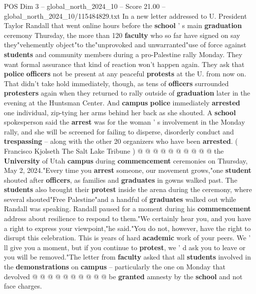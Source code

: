 \begin{textsample}{POS Dim 3 – global\_north\_2024\_10 – Score 21.00 – global\_north\_2024\_10/115484829.txt}  \label{ex:f3_pos_150}
In a new letter addressed to U.
President Taylor Randall that went online hours before the \textbf{school} ' s main \textbf{graduation} ceremony Thursday, the more than 120 \textbf{faculty} who so far have signed on say they"vehemently object"to the"unprovoked and unwarranted"use of force against \textbf{students} and community members during a pro-Palestine rally Monday.
They want formal assurance that kind of reaction won't happen again.
They ask that \textbf{police} \textbf{officers} not be present at any peaceful \textbf{protests} at the U. from now on.
That didn't take hold immediately, though, as tens of \textbf{officers} surrounded \textbf{protesters} again when they returned to rally outside of \textbf{graduation} later in the evening at the Huntsman Center.
And \textbf{campus} \textbf{police} immediately \textbf{arrested} one individual, zip-tying her arms behind her back as she shouted.
A \textbf{school} spokesperson said the \textbf{arrest} was for the woman ' s involvement in the Monday rally, and she will be screened for failing to disperse, disorderly conduct and \textbf{trespassing} -- along with the other 20 organizers who have been \textbf{arrested}. ( Francisco Kjolseth The Salt Lake Tribune ) @ @ @ @ @ @ @ @ @ @ the \textbf{University} of Utah \textbf{campus} during \textbf{commencement} ceremonies on Thursday, May 2, 2024."Every time you \textbf{arrest} someone, our movement grows,"one \textbf{student} shouted after \textbf{officers}, as families and \textbf{graduates} in gowns walked past.
The \textbf{students} also brought their \textbf{protest} inside the arena during the ceremony, where several shouted"Free Palestine"and a handful of \textbf{graduates} walked out while Randall was speaking.
Randall paused for a moment during his \textbf{commencement} address about resilience to respond to them."We certainly hear you, and you have a right to express your viewpoint,"he said."You do not, however, have the right to disrupt this celebration.
This is years of hard \textbf{academic} work of your peers.
We ' ll give you a moment, but if you continue to \textbf{protest}, we ' d ask you to leave or you will be removed."The letter from \textbf{faculty} asked that all \textbf{students} involved in the \textbf{demonstrations} on \textbf{campus} -- particularly the one on Monday that devolved @ @ @ @ @ @ @ @ @ @ be \textbf{granted} amnesty by the \textbf{school} and not face charges.

\end{textsample}
